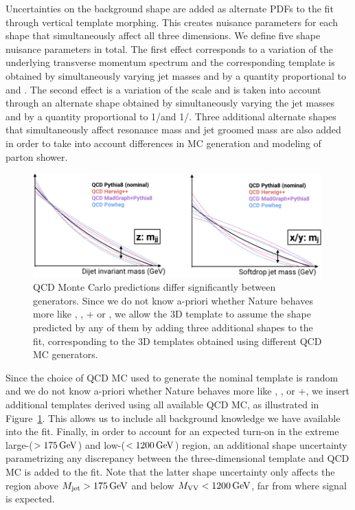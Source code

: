 Uncertainties on the background shape are added as alternate PDFs to the fit through vertical template morphing. This creates nuisance parameters for each shape that simultaneously affect all three dimensions. We define five shape nuisance parameters in total. The first effect corresponds to a variation of the underlying transverse momentum spectrum and the corresponding template is obtained by simultaneously varying jet masses and \MVV by a quantity proportional to \MVV and \MJ. The second effect is a variation of the scale and is taken into account through an alternate shape obtained by simultaneously varying the jet masses and \MVV by a quantity proportional to 1/\MVV and 1/\MJ.
Three additional alternate shapes that simultaneously affect resonance mass and jet groomed mass are also added in order to take into account differences in MC generation and modeling of parton shower.
\begin{figure}[h!]
\centering
\includegraphics[width=0.99\textwidth]{figures/analysis/search3/misc/nonResUnc.png}
\caption{QCD Monte Carlo predictions differ significantly between generators. Since we do not know a-priori whether Nature behaves more like , \HERWIG{++}, \MADGRAPH{}+ or \POWHEG{}, we allow the 3D template to assume the shape predicted by any of them by adding three additional shapes to the fit, corresponding to the 3D templates obtained using different QCD MC generators.}
\label{fig:searchIII:bkgunc}
\end{figure}
Since the choice of QCD MC used to generate the nominal template is random and we do not know a-priori whether Nature behaves
more like , \HERWIG{++}, or \MADGRAPH{}+, we insert additional templates derived using all available QCD MC, as illustrated in Figure~\ref{fig:searchIII:bkgunc}. This allows us to include all background knowledge we have available into the fit. Finally, in order to account for an expected \MVV turn-on in the extreme large-\MJ ($>175 \,\text{Ge\hspace{-.08em}V}$) and low-\MVV($<1200 \,\text{Ge\hspace{-.08em}V}$) region, an additional shape uncertainty parametrizing any discrepancy between the three-dimensional template and QCD MC is added to the fit. Note that the latter shape uncertainty only affects the region above $M_{\rm jet} >175 \,\text{Ge\hspace{-.08em}V}$ and below $M_{\rm VV}<1200 \,\text{Ge\hspace{-.08em}V}$, far from where signal is expected.
